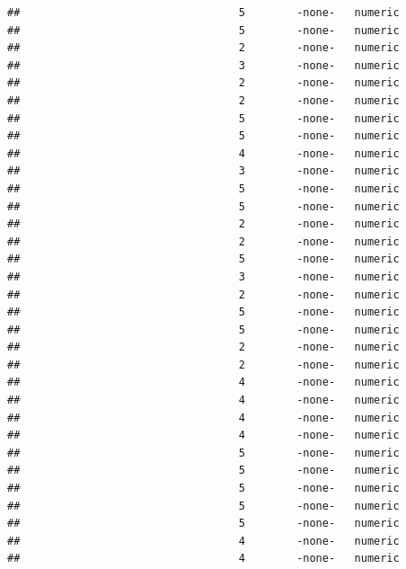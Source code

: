 \documentclass[
  12pt,
]{article}
\begin{document}
\begin{verbatim}
##                                  5        -none-   numeric                    
##                                  5        -none-   numeric                    
##                                  2        -none-   numeric                    
##                                  3        -none-   numeric                    
##                                  2        -none-   numeric                    
##                                  2        -none-   numeric                    
##                                  5        -none-   numeric                    
##                                  5        -none-   numeric                    
##                                  4        -none-   numeric                    
##                                  3        -none-   numeric                    
##                                  5        -none-   numeric                    
##                                  5        -none-   numeric                    
##                                  2        -none-   numeric                    
##                                  2        -none-   numeric                    
##                                  5        -none-   numeric                    
##                                  3        -none-   numeric                    
##                                  2        -none-   numeric                    
##                                  5        -none-   numeric                    
##                                  5        -none-   numeric                    
##                                  2        -none-   numeric                    
##                                  2        -none-   numeric                    
##                                  4        -none-   numeric                    
##                                  4        -none-   numeric                    
##                                  4        -none-   numeric                    
##                                  4        -none-   numeric                    
##                                  5        -none-   numeric                    
##                                  5        -none-   numeric                    
##                                  5        -none-   numeric                    
##                                  5        -none-   numeric                    
##                                  5        -none-   numeric                    
##                                  4        -none-   numeric                    
##                                  4        -none-   numeric                    

\end{verbatim}
\end{document}
